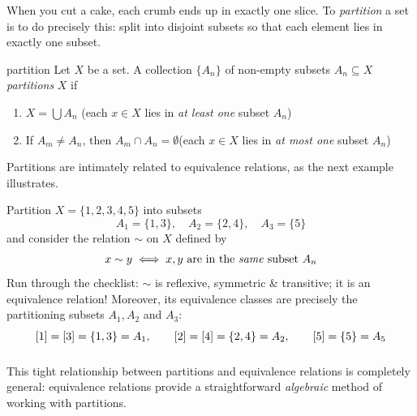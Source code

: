 \vspace{-8pt}


When you cut a cake, each crumb ends up in exactly one slice. To \emph{partition} a set is to do precisely this: split into disjoint subsets so that each element lies in exactly one subset.

\begin{defn}{}{partition}
	Let $X$ be a set. A collection $\{A_n\}$ of non-empty subsets $A_n\subseteq X$ \emph{partitions} $X$ if
	\begin{enumerate}
		\item $X=\bigcup A_n$ \hfill(each $x\in X$ lies in \emph{at least one} subset $A_n$)
		\item If $A_m\neq A_n$, then $A_m\cap A_n=\emptyset$\hfill(each $x\in X$ lies in \emph{at most one\footnotemark} subset $A_n$)
	\end{enumerate}
\end{defn}



Partitions are intimately related to equivalence relations, as the next example illustrates.

\begin{example}{}{}
	Partition $X=\{1,2,3,4,5\}$ into subsets
	\[
		A_1=\{1,3\},\quad A_2=\{2,4\},\quad A_3=\{5\}
	\]
	and consider the relation $\sim$ on $X$ defined by\footnotemark
	\[
		x\sim y\iff \text{$x,y$ are in the \emph{same} subset $A_n$}
	\]
	Run through the checklist: $\sim$ is reflexive, symmetric \& transitive; it is an equivalence relation! Moreover, its equivalence classes are precisely the partitioning subsets $A_1,A_2$ and $A_3$:
	\[
		[1]=[3]=\{1,3\}=A_1,\qquad [2]=[4]=\{2,4\}=A_2,\qquad [5]=\{5\}=A_5 \rule[-10pt]{0pt}{10pt}
	\]
\end{example} 



\vspace*{-10pt}

\goodbreak


This tight relationship between partitions and equivalence relations is completely general: equivalence relations provide a straightforward \emph{algebraic} method of working with partitions.

